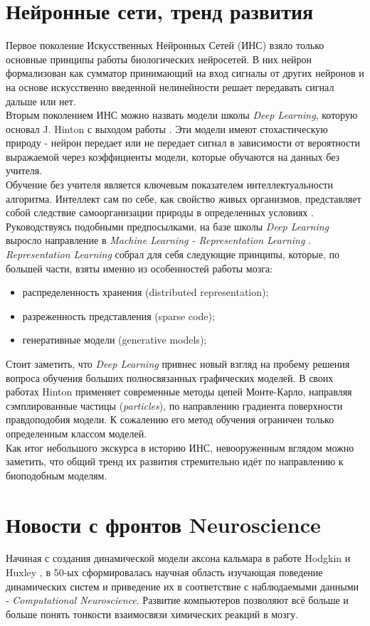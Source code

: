 \documentclass[a4paper,10pt]{article}
\begin{document}
\section{Нейронные сети, тренд развития}
Первое поколение Искусственных Нейронных Сетей (ИНС) взяло только основные принципы работы биологических нейросетей. В них нейрон формализован как сумматор принимающий на вход сигналы от других нейронов и на основе искусственно введенной нелинейности решает передавать сигнал дальше или нет.\\
\indent Вторым поколением ИНС можно назвать модели школы \textit{Deep Learning}, которую основал J. Hinton с выходом работы \cite{hinton2006}. Эти модели имеют стохастическую природу - нейрон передает или не передает сигнал в зависимости от вероятности выражаемой через коэффициенты модели, которые обучаются на данных без учителя.\\ 
\indent Обучение без учителя является ключевым показателем интеллектуальности алгоритма. Интеллект сам по себе, как свойство живых организмов, представляет собой следствие самоорганизации природы в определенных условиях \cite{evolut}. Руководствуясь подобными предпосылками, на базе школы \textit{Deep Learning} выросло направление в \textit{Machine Learning - Representation Learning} \cite{yoshua}.\\
\indent \textit{Representation Learning} собрал для себя следующие принципы, которые, по большей части, взяты именно из особенностей работы мозга:
\begin{itemize}
\item распределенность хранения (distributed representation);
\item разреженность представления (sparse code);
\item генеративные модели (generative models);
\end{itemize} 
\indent \indent Стоит заметить, что \textit{Deep Learning} привнес новый взгляд на пробему решения вопроса обучения больших полносвязанных графических моделей. В своих работах Hinton применяет современные методы цепей Монте-Карло, направляя сэмплированные частицы (\textit{particles}), по направлению градиента поверхности правдоподобия модели. К сожалению его метод обучения ограничен только определенным классом моделей.\\
\indent Как итог небольшого экскурса в историю ИНС, невооруженным вглядом можно заметить, что общий тренд их развития стремительно идёт по направлению к биоподобным моделям.
\section{Новости с фронтов Neuroscience}
\label{sec:neuroscience}
Начиная с создания динамической модели аксона кальмара в работе Hodgkin и Huxley \cite{hodhux}, в 50-ых сформировалась научная область изучающая поведение динамических систем и приведение их в соответствие с наблюдаемыми данными - \textit{Computational Neuroscience}. Развитие компьютеров позволяют всё больше и больше понять тонкости взаимосвязи химических реакций в мозгу.\\ 
\end{document}
